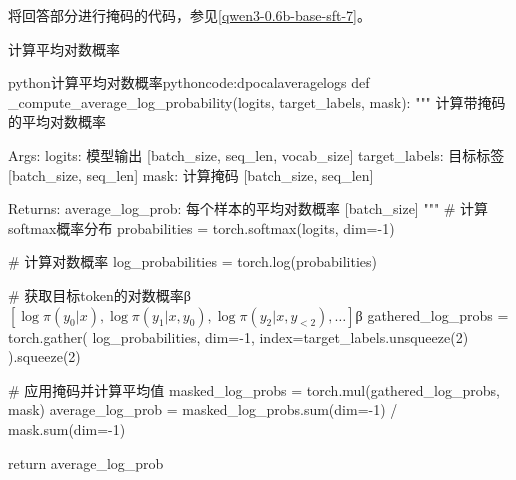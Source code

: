 \documentclass[lang=cn,newtx,10pt,scheme=chinese]{elegantbook}
\begin{document}
将回答部分进行掩码的代码，参见\ref{qwen3-0.6b-base-sft-7}。

计算平均对数概率

\begin{codebox}{python}{计算平均对数概率}{pythoncode:dpocalaveragelogs}
def _compute_average_log_probability(logits, target_labels, mask):
    """
    计算带掩码的平均对数概率
    
    Args:
        logits: 模型输出 [batch_size, seq_len, vocab_size]
        target_labels: 目标标签 [batch_size, seq_len]
        mask: 计算掩码 [batch_size, seq_len]
    
    Returns:
        average_log_prob: 每个样本的平均对数概率 [batch_size]
    """
    # 计算softmax概率分布
    probabilities = torch.softmax(logits, dim=-1)
    
    # 计算对数概率
    log_probabilities = torch.log(probabilities)
    
    # 获取目标token的对数概率β$[\log\pi(y_0|x),\log\pi(y_1|x,y_0),\log\pi(y_2|x,y_{<2}),\dots]$β
    gathered_log_probs = torch.gather(
        log_probabilities, 
        dim=-1, 
        index=target_labels.unsqueeze(2)
    ).squeeze(2)
    
    # 应用掩码并计算平均值
    masked_log_probs = torch.mul(gathered_log_probs, mask)
    average_log_prob = masked_log_probs.sum(dim=-1) / mask.sum(dim=-1)
    
    return average_log_prob
\end{codebox}
\end{document}
